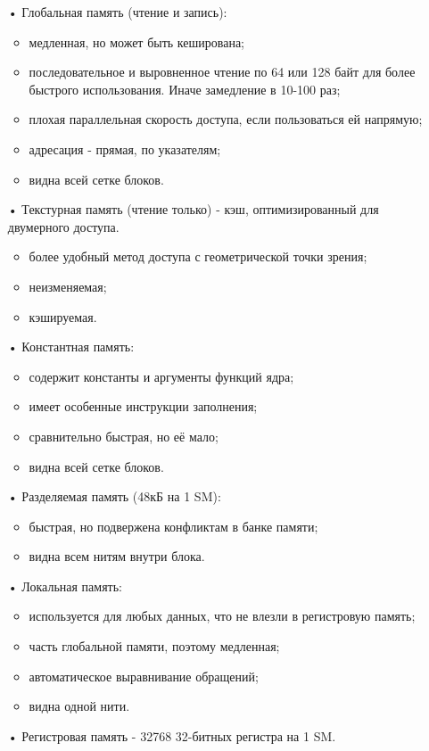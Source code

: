 \documentclass[a4paper,14pt,russian]{extreport}
\begin{document}
  \begin{itemize}
  \item[•] Глобальная память (чтение и запись):
    \begin{itemize}
    \item медленная, но может быть кеширована;
    \item последовательное и выровненное чтение по 64 или 128 байт для более быстрого использования. Иначе замедление в 10-100 раз;
    \item плохая параллельная скорость доступа, если пользоваться ей напрямую;
    \item адресация - прямая, по указателям;
    \item видна всей сетке блоков. 
    \end{itemize}
  \item[•] Текстурная память (чтение только) - кэш, оптимизированный для двумерного доступа.
    \begin{itemize}
    \item более удобный метод доступа с геометрической точки зрения;
    \item неизменяемая;
    \item кэшируемая.
    \end{itemize}
  \item[•] Константная память:
    \begin{itemize}
    \item содержит константы и аргументы функций ядра;
    \item имеет особенные инструкции заполнения;
    \item сравнительно быстрая, но её мало;
    \item видна всей сетке блоков. 
    \end{itemize}
  \item[•] Разделяемая память (48кБ на 1 SM):
    \begin{itemize}
    \item быстрая, но подвержена конфликтам в банке памяти;
    \item видна всем нитям внутри блока.
    \end{itemize}
  \item[•] Локальная память:
    \begin{itemize}
    \item используется для любых данных, что не влезли в регистровую память;
    \item часть глобальной памяти, поэтому медленная;
    \item автоматическое выравнивание обращений;
    \item видна одной нити.
    \end{itemize}
  \item[•] Регистровая память - 32768 32-битных регистра на 1 SM.
  \end{itemize}
\end{document}
